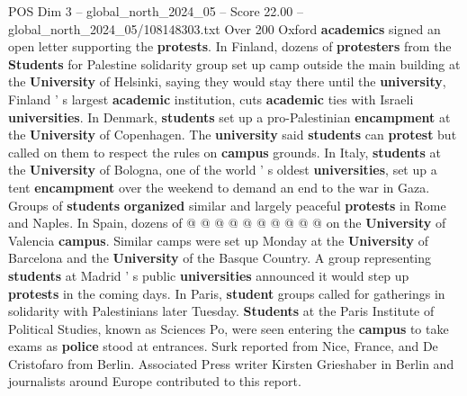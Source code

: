 \begin{textsample}{POS Dim 3 – global\_north\_2024\_05 – Score 22.00 – global\_north\_2024\_05/108148303.txt}
Over 200 Oxford \textbf{academics} signed an open letter supporting the \textbf{protests}.
In Finland, dozens of \textbf{protesters} from the \textbf{Students} for Palestine solidarity group set up camp outside the main building at the \textbf{University} of Helsinki, saying they would stay there until the \textbf{university}, Finland ' s largest \textbf{academic} institution, cuts \textbf{academic} ties with Israeli \textbf{universities}.
In Denmark, \textbf{students} set up a pro-Palestinian \textbf{encampment} at the \textbf{University} of Copenhagen.
The \textbf{university} said \textbf{students} can \textbf{protest} but called on them to respect the rules on \textbf{campus} grounds.
In Italy, \textbf{students} at the \textbf{University} of Bologna, one of the world ' s oldest \textbf{universities}, set up a tent \textbf{encampment} over the weekend to demand an end to the war in Gaza.
Groups of \textbf{students} \textbf{organized} similar and largely peaceful \textbf{protests} in Rome and Naples.
In Spain, dozens of @ @ @ @ @ @ @ @ @ @ on the \textbf{University} of Valencia \textbf{campus}.
Similar camps were set up Monday at the \textbf{University} of Barcelona and the \textbf{University} of the Basque Country.
A group representing \textbf{students} at Madrid ' s public \textbf{universities} announced it would step up \textbf{protests} in the coming days.
In Paris, \textbf{student} groups called for gatherings in solidarity with Palestinians later Tuesday. \textbf{Students} at the Paris Institute of Political Studies, known as Sciences Po, were seen entering the \textbf{campus} to take exams as \textbf{police} stood at entrances.
Surk reported from Nice, France, and De Cristofaro from Berlin.
Associated Press writer Kirsten Grieshaber in Berlin and journalists around Europe contributed to this report.

\end{textsample}
